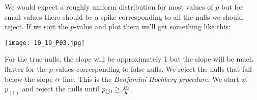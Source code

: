 We would expect a roughly uniform distribution for most values of $p$ but for small values there should be a spike corresponding to all the nulls we should reject. If we sort the $p$-value and plot them we'll get something like this:

\begin{center}
    \texttt{[image: 10\_19\_P03.jpg]}
\end{center}

For the true nulls, the slope will be approximately 1 but the slope will be much flatter for the $p$-values corresponding to false nulls. We reject the nulls that fall below the slope ${\alpha}$ line. This is the \emph{Benjamini Hochberg procedure}. We start at $p_{(1)}$ and reject the nulls until $p_{(j)} \ge \frac{j{\alpha}}{k}$.
